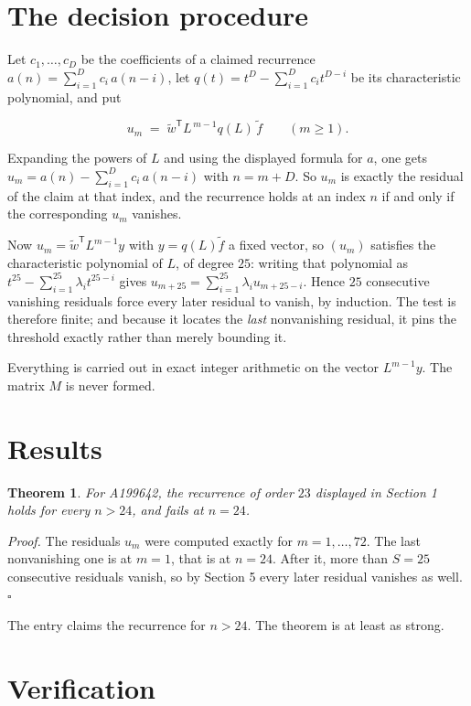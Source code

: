 \documentclass[11pt]{article}
\newtheorem{theorem}{Theorem}
\theoremstyle{definition}
\begin{document}
\section{The decision procedure}

Let $c_1,\dots,c_D$ be the coefficients of a claimed recurrence $a(n) = \sum_{i=1}^{D} c_i\,a(n-i)$, let $q(t) = t^{D} - \sum_{i=1}^{D} c_i t^{D-i}$ be its characteristic polynomial, and put

\[u_m \;=\; \tilde w^{\mathsf T} L^{\,m-1} q(L)\,\tilde f \qquad (m \ge 1).\]

Expanding the powers of $L$ and using the displayed formula for $a$, one gets $u_m = a(n) - \sum_{i=1}^{D} c_i\,a(n-i)$ with $n = m + D$. So $u_m$ is exactly the residual of the claim at that index, and the recurrence holds at an index $n$ if and only if the corresponding $u_m$ vanishes.

Now $u_m = \tilde w^{\mathsf T} L^{m-1} y$ with $y = q(L)\tilde f$ a fixed vector, so $(u_m)$ satisfies the characteristic polynomial of $L$, of degree $25$: writing that polynomial as $t^{25} - \sum_{i=1}^{25} \lambda_i t^{25-i}$ gives $u_{m+25} = \sum_{i=1}^{25} \lambda_i u_{m+25-i}$. Hence $25$ consecutive vanishing residuals force every later residual to vanish, by induction. The test is therefore finite; and because it locates the {\itshape last} nonvanishing residual, it pins the threshold exactly rather than merely bounding it.

Everything is carried out in exact integer arithmetic on the vector $L^{m-1}y$. The matrix $M$ is never formed.

\section{Results}

\begin{theorem} For A199642, the recurrence of order $23$ displayed in Section 1 holds for every $n > 24$, and fails at $n = 24$.\end{theorem}

{\itshape Proof.} The residuals $u_m$ were computed exactly for $m = 1,\dots,72$. The last nonvanishing one is at $m = 1$, that is at $n = 24$. After it, more than $S = 25$ consecutive residuals vanish, so by Section 5 every later residual vanishes as well. $\square$

The entry claims the recurrence for $n > 24$. The theorem is at least as strong.

\section{Verification}
\end{document}
